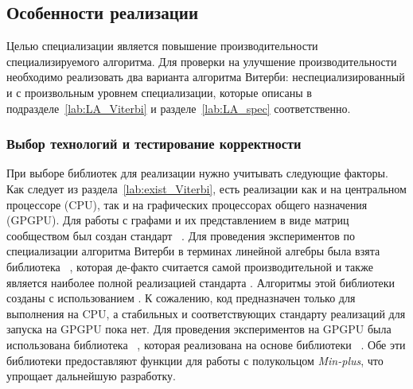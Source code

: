 \subsection{Особенности реализации}
Целью специализации является повышение производительности 
специализируемого алгоритма.
Для проверки на улучшение производительности необходимо 
реализовать два варианта алгоритма Витерби: 
неспециализированный и с произвольным уровнем специализации, 
которые описаны в подразделе~\ref{lab:LA_Viterbi} 
и разделе~\ref{lab:LA_spec} соответственно.

\subsubsection{Выбор технологий и тестирование корректности}
При выборе библиотек для реализации нужно учитывать следующие 
факторы.
Как следует из раздела~\ref{lab:exist_Viterbi}, 
есть реализации как и на центральном процессоре (CPU), так и 
на графических процессорах общего назначения (GPGPU).
Для работы с графами и их представлением в виде матриц 
сообществом был создан 
стандарт ~\cite{GraphBLAS}.
Для проведения экспериментов по специализации алгоритма 
Витерби в терминах линейной алгебры была взята библиотека 
~\cite{SuiteSparse}, 
которая де-факто считается самой производительной и также 
является наиболее полной реализацией стандарта 
.
Алгоритмы этой библиотеки созданы с использованием .
К сожалению, код  
предназначен только для выполнения на CPU, а стабильных и 
соответствующих стандарту  реализаций для 
запуска на GPGPU пока нет.
Для проведения экспериментов на GPGPU была использована 
библиотека ~\cite{cuASR}, которая реализована на основе библиотеки ~\cite{Cutlass}.
Обе эти библиотеки предоставляют функции для работы с 
полукольцом \emph{Min-plus}, что упрощает дальнейшую 
разработку.

